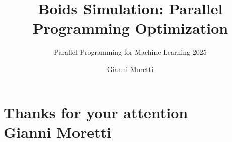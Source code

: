 \documentclass{antclass}
\title{Boids Simulation: Parallel Programming Optimization}
\subtitle{Parallel Programming for Machine Learning 2025}
\author{Gianni Moretti}
\begin{document}
\maketitle









\chapter{Thanks for your attention
\vspace{1cm}\\
\small{Gianni Moretti}}
\end{document}
